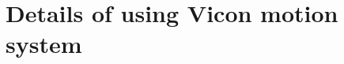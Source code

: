 \documentclass[times, 10pt,twocolumn]{article}
\begin{document}
\clearpage
\newpage

\appendix

\section{Details of using Vicon motion system}
\label{Vicon appendix}


\clearpage
\newpage

\nocite{ex1,ex2,ex3,ex4,ex5,ex6,ex7,ex8,ex9,ex10,ex11,ex12,ex13,ex14,ex15}


\end{document}
